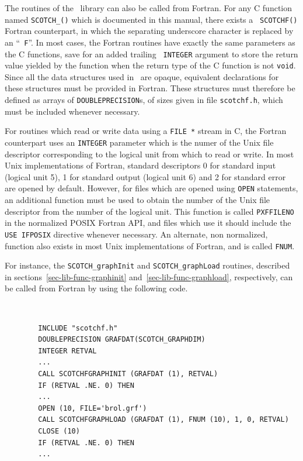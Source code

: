 The routines of the \libscotch\ library can also be called from
Fortran. For any C function named {\tt SCOTCH\_()} which is documented in this manual, there exists a {\tt
SCOTCHF()} Fortran counterpart, in which
the separating underscore character is replaced by an ``{\tt
F}''. In most cases, the Fortran routines have exactly the same
parameters as the C functions, save for an added trailing {\tt
INTEGER} argument to store the return value yielded by the function
when the return type of the C function is not {\tt void}.
\\

Since all the data structures used in \libscotch\ are
opaque, equivalent declarations for these structures must
be provided in Fortran. These structures must therefore
be defined as arrays of {\tt DOUBLEPRECISION}s, of sizes
given in file {\tt scotchf.h}, which must be included whenever
necessary.

For routines which read or write data using a {\tt FILE~*} stream
in C, the Fortran counterpart uses an {\tt INTEGER} parameter which
is the numer of the Unix file descriptor corresponding to the logical
unit from which to read or write. In most Unix implementations of
Fortran, standard descriptors 0 for standard input (logical unit 5),
1 for standard output (logical unit 6) and 2 for standard error are
opened by default. However, for files which are opened using
{\tt OPEN} statements, an additional function must be used to obtain
the number of the Unix file descriptor from the number of the logical
unit. This function is called \texttt{PXFFILENO} in the normalized
POSIX Fortran API, and files which use it should include the
\texttt{USE IFPOSIX} directive whenever necessary. An alternate, non
normalized, function also exists in most Unix implementations of
Fortran, and is called {\tt FNUM}.

For instance, the {\tt SCOTCH\_\lbt graph\lbt Init} and
{\tt SCOTCH\_\lbt graph\lbt Load} routines, described in
sections~\ref{sec-lib-func-graphinit}
and~\ref{sec-lib-func-graphload}, respectively, can
be called from Fortran by using the following code.
{\tt
\begin{verbatim}
        INCLUDE "scotchf.h"
        DOUBLEPRECISION GRAFDAT(SCOTCH_GRAPHDIM)
        INTEGER RETVAL
        ...
        CALL SCOTCHFGRAPHINIT (GRAFDAT (1), RETVAL)
        IF (RETVAL .NE. 0) THEN
        ...
        OPEN (10, FILE='brol.grf')
        CALL SCOTCHFGRAPHLOAD (GRAFDAT (1), FNUM (10), 1, 0, RETVAL)
        CLOSE (10)
        IF (RETVAL .NE. 0) THEN
        ...
\end{verbatim}
}


